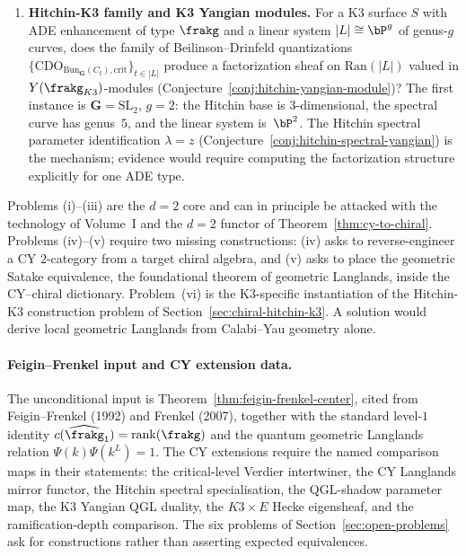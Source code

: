 \begin{enumerate}
 \item[(vi)] \textbf{Hitchin-K3 family and K3 Yangian modules.} For a K3 surface $S$ with ADE enhancement of type $\frakg$ and a linear system $|L| \cong \bP^g$ of genus-$g$ curves, does the family of Beilinson--Drinfeld quantizations $\{\mathrm{CDO}_{\mathrm{Bun}_\mathbf{G}(C_t), \mathrm{crit}}\}_{t \in |L|}$ produce a factorization sheaf on $\mathrm{Ran}(|L|)$ valued in $Y(\frakg_{K3})$-modules (Conjecture~\ref{conj:hitchin-yangian-module})? The first instance is $\mathbf{G} = \mathrm{SL}_2$, $g = 2$: the Hitchin base is $3$-dimensional, the spectral curve has genus~$5$, and the linear system is~$\bP^2$. The Hitchin spectral parameter identification $\lambda = z$ (Conjecture~\ref{conj:hitchin-spectral-yangian}) is the mechanism; evidence would require computing the factorization structure explicitly for one ADE type.
\end{enumerate}

Problems (i)--(iii) are the $d = 2$ core and can in principle be attacked with the technology of Volume~I and the $d = 2$ functor of Theorem~\ref{thm:cy-to-chiral}.
Problems (iv)--(v) require two missing constructions:
(iv) asks to reverse-engineer a CY $2$-category from a target chiral algebra, and
(v) asks to place the geometric Satake equivalence, the foundational theorem of geometric Langlands, inside the CY--chiral dictionary.
Problem~(vi) is the K3-specific instantiation of the Hitchin-K3 construction problem of Section~\ref{sec:chiral-hitchin-k3}.
A solution would derive local geometric Langlands from Calabi--Yau geometry alone.

\paragraph{Feigin--Frenkel input and CY extension data.}
The unconditional input is Theorem~\ref{thm:feigin-frenkel-center}, cited
from Feigin--Frenkel (1992) and Frenkel (2007), together with the
standard level-$1$ identity
\(c(\widehat{\frakg}_1)=\mathrm{rank}(\frakg)\) and the quantum
geometric Langlands relation \(\Psi(k)\Psi(k^L)=1\). The CY extensions
require the named comparison maps in their statements: the
critical-level Verdier intertwiner, the CY Langlands mirror functor, the
Hitchin spectral specialisation, the QGL-shadow parameter map, the K3
Yangian QGL duality, the \(K3\times E\) Hecke eigensheaf, and the
ramification-depth comparison. The six problems of
Section~\ref{sec:open-problems} ask for constructions rather than
asserting expected equivalences.

